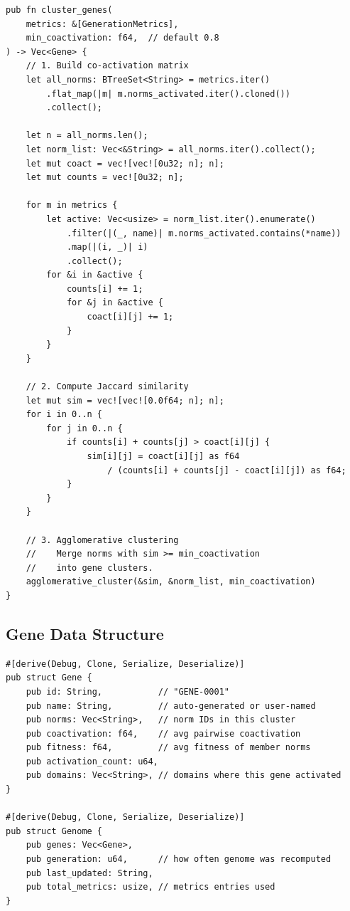\documentclass[11pt,a4paper]{article}
\begin{document}
\begin{lstlisting}[style=rust]
pub fn cluster_genes(
    metrics: &[GenerationMetrics],
    min_coactivation: f64,  // default 0.8
) -> Vec<Gene> {
    // 1. Build co-activation matrix
    let all_norms: BTreeSet<String> = metrics.iter()
        .flat_map(|m| m.norms_activated.iter().cloned())
        .collect();
    
    let n = all_norms.len();
    let norm_list: Vec<&String> = all_norms.iter().collect();
    let mut coact = vec![vec![0u32; n]; n];
    let mut counts = vec![0u32; n];
    
    for m in metrics {
        let active: Vec<usize> = norm_list.iter().enumerate()
            .filter(|(_, name)| m.norms_activated.contains(*name))
            .map(|(i, _)| i)
            .collect();
        for &i in &active {
            counts[i] += 1;
            for &j in &active {
                coact[i][j] += 1;
            }
        }
    }
    
    // 2. Compute Jaccard similarity
    let mut sim = vec![vec![0.0f64; n]; n];
    for i in 0..n {
        for j in 0..n {
            if counts[i] + counts[j] > coact[i][j] {
                sim[i][j] = coact[i][j] as f64 
                    / (counts[i] + counts[j] - coact[i][j]) as f64;
            }
        }
    }
    
    // 3. Agglomerative clustering
    //    Merge norms with sim >= min_coactivation
    //    into gene clusters.
    agglomerative_cluster(&sim, &norm_list, min_coactivation)
}
\end{lstlisting}

\subsection{Gene Data Structure}

\begin{lstlisting}[style=rust]
#[derive(Debug, Clone, Serialize, Deserialize)]
pub struct Gene {
    pub id: String,           // "GENE-0001"
    pub name: String,         // auto-generated or user-named
    pub norms: Vec<String>,   // norm IDs in this cluster
    pub coactivation: f64,    // avg pairwise coactivation
    pub fitness: f64,         // avg fitness of member norms
    pub activation_count: u64,
    pub domains: Vec<String>, // domains where this gene activated
}

#[derive(Debug, Clone, Serialize, Deserialize)]
pub struct Genome {
    pub genes: Vec<Gene>,
    pub generation: u64,      // how often genome was recomputed
    pub last_updated: String,
    pub total_metrics: usize, // metrics entries used
}
\end{lstlisting}
\end{document}
